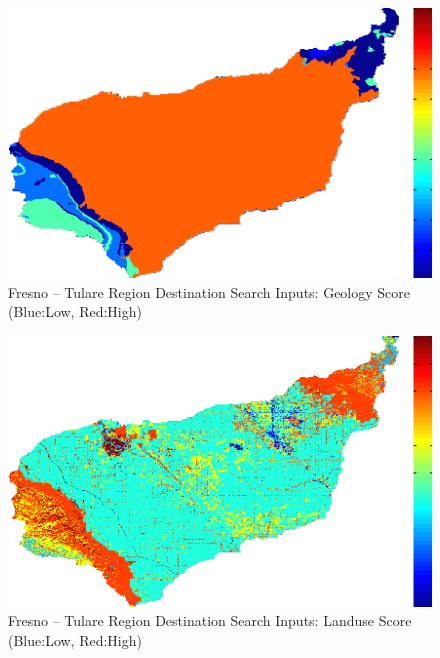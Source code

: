         \begin{figure}[!h]
            \begin{center}
            \includegraphics[width=5.5in]{figures/Fresno_Search_Geology.png}   
            \caption{Fresno -- Tulare Region Destination Search Inputs: Geology Score (Blue:Low, Red:High)}
            \label{fig:Fdsinputs_geology}
            \end{center}
        \end{figure}
    
        \begin{figure}[!h]
            \begin{center}
            \includegraphics[width=5.5in]{figures/Fresno_Search_Landuse.png}   
            \caption{Fresno -- Tulare Region Destination Search Inputs: Landuse Score (Blue:Low, Red:High)}
            \label{fig:Fdsinputs_landuse}
            \end{center}
        \end{figure}
    
